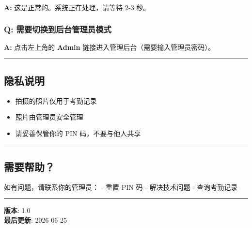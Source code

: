 \documentclass[
]{article}
\providecommand{\tightlist}{%
  \setlength{\itemsep}{0pt}\setlength{\parskip}{0pt}}
\begin{document}
\textbf{A:} 这是正常的。系统正在处理，请等待 2-3 秒。

\subsubsection{Q:
需要切换到后台管理员模式}\label{q-ux9700ux8981ux5207ux6362ux5230ux540eux53f0ux7ba1ux7406ux5458ux6a21ux5f0f}

\textbf{A:} 点击左上角的 \textbf{Admin}
链接进入管理后台（需要输入管理员密码）。

\begin{center}\rule{0.5\linewidth}{0.5pt}\end{center}

\subsection{隐私说明}\label{ux9690ux79c1ux8bf4ux660e}

\begin{itemize}
\tightlist
\item
  拍摄的照片仅用于考勤记录
\item
  照片由管理员安全管理
\item
  请妥善保管你的 PIN 码，不要与他人共享
\end{itemize}

\begin{center}\rule{0.5\linewidth}{0.5pt}\end{center}

\subsection{需要帮助？}\label{ux9700ux8981ux5e2eux52a9}

如有问题，请联系你的管理员： - 重置 PIN 码 - 解决技术问题 - 查询考勤记录

\begin{center}\rule{0.5\linewidth}{0.5pt}\end{center}

\textbf{版本}: 1.0\\
\textbf{最后更新}: 2026-06-25
\end{document}
